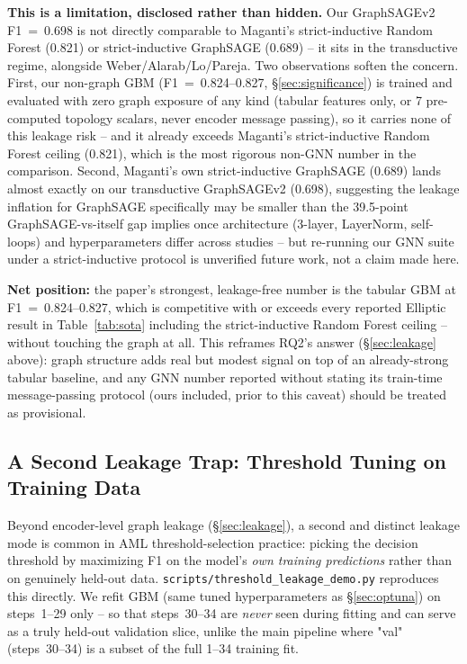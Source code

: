\documentclass[conference]{IEEEtran}
\begin{document}
\textbf{This is a limitation, disclosed rather than hidden.} Our
GraphSAGEv2 F1~=~0.698 is not directly comparable to Maganti's
strict-inductive Random Forest (0.821) or strict-inductive GraphSAGE
(0.689) -- it sits in the transductive regime, alongside Weber/Alarab/Lo/Pareja.
Two observations soften the concern. First, our non-graph GBM (F1~=~0.824--0.827,
\S\ref{sec:significance}) is trained and evaluated with zero graph exposure
of any kind (tabular features only, or 7 pre-computed topology scalars,
never encoder message passing), so it carries none of this leakage risk --
and it already exceeds Maganti's strict-inductive Random Forest ceiling
(0.821), which is the most rigorous non-GNN number in the comparison.
Second, Maganti's own strict-inductive GraphSAGE (0.689) lands almost
exactly on our transductive GraphSAGEv2 (0.698), suggesting the leakage
inflation for GraphSAGE specifically may be smaller than the 39.5-point
GraphSAGE-vs-itself gap implies once architecture (3-layer, LayerNorm,
self-loops) and hyperparameters differ across studies -- but re-running our
GNN suite under a strict-inductive protocol is unverified future work, not
a claim made here.

\textbf{Net position:} the paper's strongest, leakage-free number is the
tabular GBM at F1~=~0.824--0.827, which is competitive with or exceeds
every reported Elliptic result in Table~\ref{tab:sota} including the
strict-inductive Random Forest ceiling -- without touching the graph at
all. This reframes RQ2's answer (\S\ref{sec:leakage} above): graph
structure adds real but modest signal on top of an already-strong tabular
baseline, and any GNN number reported without stating its train-time
message-passing protocol (ours included, prior to this caveat) should be
treated as provisional.

\subsection{A Second Leakage Trap: Threshold Tuning on Training Data}
\label{sec:threshold-leakage}

Beyond encoder-level graph leakage (\S\ref{sec:leakage}), a second and
distinct leakage mode is common in AML threshold-selection practice:
picking the decision threshold by maximizing F1 on the model's \emph{own
training predictions} rather than on genuinely held-out data.
\texttt{scripts/threshold\_leakage\_demo.py} reproduces this directly. We
refit GBM (same tuned hyperparameters as \S\ref{sec:optuna}) on steps~1--29
only -- so that steps~30--34 are \emph{never} seen during fitting and can
serve as a truly held-out validation slice, unlike the main pipeline where
"val" (steps~30--34) is a subset of the full 1--34 training fit.
\end{document}
